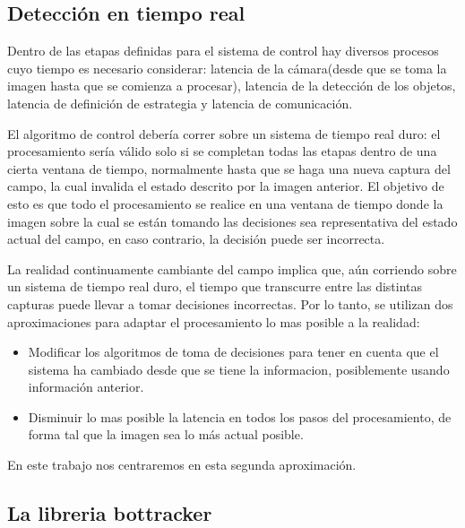 \documentclass[a4paper,10pt]{report}
\begin{document}
\subsection{Detección en tiempo real}
Dentro de las etapas definidas para el sistema de control hay diversos procesos cuyo tiempo es necesario considerar: latencia de la cámara(desde que se toma la imagen hasta que se comienza a procesar),
latencia de la detección de los objetos, latencia de definición de estrategia y latencia de comunicación.


El algoritmo de control debería correr sobre un sistema de tiempo real duro: el procesamiento sería válido solo si se completan todas las etapas dentro de una cierta ventana de tiempo, normalmente hasta que se haga una nueva captura del campo, la cual invalida el estado descrito por la imagen anterior.
El objetivo de esto es que todo el procesamiento se realice en una ventana de tiempo donde la imagen sobre la cual se están tomando las decisiones sea representativa del estado actual del campo, en caso contrario, la decisión puede ser incorrecta.

La realidad continuamente cambiante del campo implica que, aún corriendo sobre un sistema de tiempo real duro, el tiempo que transcurre entre las distintas capturas puede llevar a tomar decisiones incorrectas.
Por lo tanto, se utilizan dos aproximaciones para adaptar el procesamiento lo mas posible a la realidad: 
\begin{itemize}
 \item Modificar los algoritmos de toma de decisiones para tener en cuenta que el sistema ha cambiado desde que se tiene la informacion, posiblemente usando información anterior.
 \item Disminuir lo mas posible la latencia en todos los pasos del procesamiento, de forma tal que la imagen sea lo más actual posible.
\end{itemize}

En este trabajo nos centraremos en esta segunda aproximación.






\subsection{La libreria bottracker}
\end{document}

